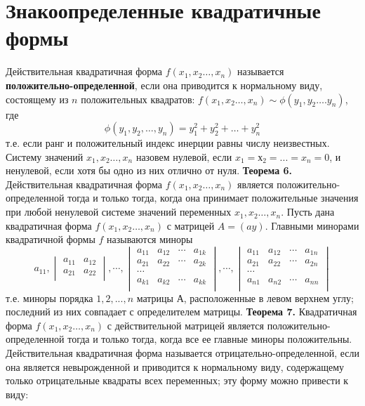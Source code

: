 \documentclass[bachelor, och, coursework, times]{SCWorks}
\newcommand\tab[1][1cm]{\hspace*{#1}}
\newcommand{\tl}{\newline\tab}
\begin{document}
\section{Знакоопределенные квадратичные формы}
\tab Действительная квадратичная форма $f(x_1,x_2…,x_n)$ называется\\ \textbf{положительно-определенной}, если она приводится к нормальному виду, состоящему из $n$ положительных квадратов: $f(x_1,x_2…,x_n) \sim \phi(y_1,y_2….y_n)$, где \newline
$$\phi(y_1,y_2, … ,y_n)=y_1^2+y_2^2+…+y_n^2$$ т.е. если ранг и положительный индекс инерции равны числу неизвестных.
\tl
Систему значений $x_1,x_2…,x_n$ назовем нулевой, если $x_1 = х_2 = ... = x_n = 0$, и ненулевой, если хотя бы одно из них отлично от нуля.
\tl
\textbf{Теорема 6.} Действительная квадратичная форма $f(x_1,x_2…,x_n)$ является положительно-определенной тогда и только тогда, когда она принимает положительные значения при любой ненулевой системе значений переменных $x_1,x_2…,x_n$.
\tl Пусть дана квадратичная форма $f(x_1,x_2…,x_n)$ с матрицей $A = (ay)$. Главными минорами квадратичной формы $f$ называются миноры  
$$a_{11}, 
\begin{vmatrix}
a_{11} & a_{12} \\ 
a_{21} & a_{22} \\ 
\end{vmatrix},
\cdots
,
\begin{vmatrix}
a_{11} & a_{12} & \cdots & a_{1k} \\ 
a_{21} & a_{22} & \cdots & a_{2k} \\ 
\cdots \\
a_{k1} & a_{k2} & \cdots & a_{kk} \\ 
\end{vmatrix}
,
\cdots
,
\begin{vmatrix}
a_{11} & a_{12} & \cdots & a_{1n} \\ 
a_{21} & a_{22} & \cdots & a_{2n} \\ 
\cdots \\
a_{n1} & a_{n2} & \cdots & a_{nn} \\ 
\end{vmatrix}
$$
\tab т.е. миноры порядка $1, 2, ... , n$ матрицы $А$, расположенные в левом верхнем углу; последний из них совпадает с определителем матрицы.
\tl
\textbf{Теорема 7.} Квадратичная форма $f(x_1,x_2…,x_n)$ с действительной матрицей является положительно-определенной тогда и только тогда, когда все ее главные миноры положительны.
\tl
Действительная квадратичная форма называется отрицательно-определенной, если она является невырожденной и приводится к нормальному виду, содержащему только отрицательные квадраты всех переменных; эту форму можно привести к виду:
\end{document}
